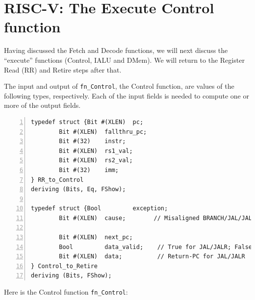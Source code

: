\section{RISC-V: The Execute Control function}

\label{Sec_fn_Control}


Having discussed the Fetch and Decode functions, we will next discuss
the ``execute'' functions (Control, IALU and DMem).  We will return to
the Register Read (RR) and Retire steps after that.

The input and output of \verb|fn_Control|, the Control function, are
values of the following types, respectively.  Each of the input fields
is needed to compute one or more of the output fields.

{\small
\begin{Verbatim}[frame=single, numbers=left]
typedef struct {Bit #(XLEN)  pc;
		Bit #(XLEN)  fallthru_pc;
		Bit #(32)    instr;
		Bit #(XLEN)  rs1_val;
		Bit #(XLEN)  rs2_val;
		Bit #(32)    imm;
} RR_to_Control
deriving (Bits, Eq, FShow);

typedef struct {Bool         exception;
		Bit #(XLEN)  cause;        // Misaligned BRANCH/JAL/JALR target

		Bit #(XLEN)  next_pc;
		Bool         data_valid;    // True for JAL/JALR; False for BRANCH
		Bit #(XLEN)  data;          // Return-PC for JAL/JALR
} Control_to_Retire
deriving (Bits, FShow);
\end{Verbatim}
}

Here is the Control function \verb|fn_Control|:

